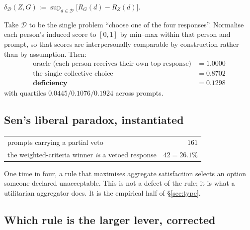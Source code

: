 \begin{definition}[Deficiency]
$\displaystyle \delta_{\mathcal{D}}(Z,G) := \sup_{d \in \mathcal{D}}\big[R_G(d)-R_Z(d)\big]$.
\end{definition}

 Take $\mathcal{D}$ to be the single problem ``choose one
of the four responses''. Normalise each person's induced score to $[0,1]$ by
min--max within that person and prompt, so that scores are interpersonally
comparable by construction rather than by assumption. Then:
\begin{align*}
\text{oracle (each person receives their own top response)} &= 1.0000 \\
\text{the single collective choice} &= 0.8702 \\
\textbf{deficiency} &= \mathbf{0.1298}
\end{align*}
with quartiles $0.0445 / 0.1076 / 0.1924$ across prompts.


\subsection{Sen's liberal paradox, instantiated}

\begin{table}[H]\centering\small
\begin{tabular}{lr}
\toprule
prompts carrying a partial veto & $161$\\
the weighted-criteria winner \emph{is} a vetoed response & $42 = \mathbf{26.1\%}$\\
\bottomrule
\end{tabular}
\label{tab:sen}
\end{table}

One time in four, a rule that maximises aggregate satisfaction selects an option
someone declared unacceptable. This is not a defect of the rule; it is what a
utilitarian aggregator does. It is the empirical half of §\ref{sec:type}.

\subsection{Which rule is the larger lever, corrected}

